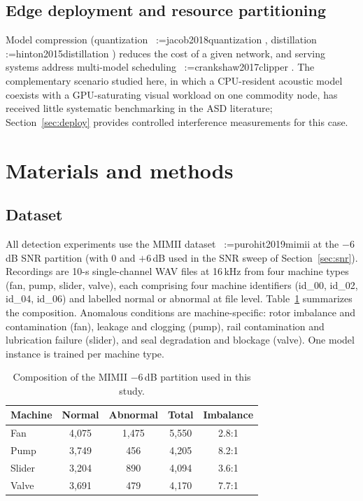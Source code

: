\documentclass[review,nopreprintline]{elsarticle}
\makeatletter
\newif\ifmc@notfirst
\let\@oldcite\cite
\def\mc@splitcite#1{%
    \begingroup
    \mc@notfirstfalse
    \@for\@citekey:=#1\do{%
      \ifmc@notfirst, \fi
      \mc@notfirsttrue
      \@oldcite{\@citekey}%
    }%
    \endgroup
  }%
\def\cite#1{\protect\mc@splitcite{#1}}%
\makeatother
\begin{document}
\subsection{Edge deployment and resource partitioning}
Model compression (quantization~\cite{jacob2018quantization}, distillation~\cite{hinton2015distillation}) reduces the cost of a given network, and serving systems address multi-model scheduling~\cite{crankshaw2017clipper}. The complementary scenario studied here, in which a CPU-resident acoustic model coexists with a GPU-saturating visual workload on one commodity node, has received little systematic benchmarking in the ASD literature; Section~\ref{sec:deploy} provides controlled interference measurements for this case.

\section{Materials and methods}
\label{sec:methods}

\subsection{Dataset}
\label{sec:dataset}
All detection experiments use the MIMII dataset~\cite{purohit2019mimii} at the $-6$\,dB SNR partition (with $0$ and $+6$\,dB used in the SNR sweep of Section~\ref{sec:snr}). Recordings are 10-s single-channel WAV files at 16\,kHz from four machine types (fan, pump, slider, valve), each comprising four machine identifiers (id\_00, id\_02, id\_04, id\_06) and labelled normal or abnormal at file level. Table~\ref{tab:dataset} summarizes the composition. Anomalous conditions are machine-specific: rotor imbalance and contamination (fan), leakage and clogging (pump), rail contamination and lubrication failure (slider), and seal degradation and blockage (valve). One model instance is trained per machine type.

\begin{table}[t]
\centering
\caption{Composition of the MIMII $-6$\,dB partition used in this study.}
\label{tab:dataset}
\begin{tabular}{lcccc}
\toprule
Machine & Normal & Abnormal & Total & Imbalance \\
\midrule
Fan    & 4{,}075 & 1{,}475 & 5{,}550 & 2.8:1 \\
Pump   & 3{,}749 & 456     & 4{,}205 & 8.2:1 \\
Slider & 3{,}204 & 890     & 4{,}094 & 3.6:1 \\
Valve  & 3{,}691 & 479     & 4{,}170 & 7.7:1 \\
\bottomrule
\end{tabular}
\end{table}
\end{document}
